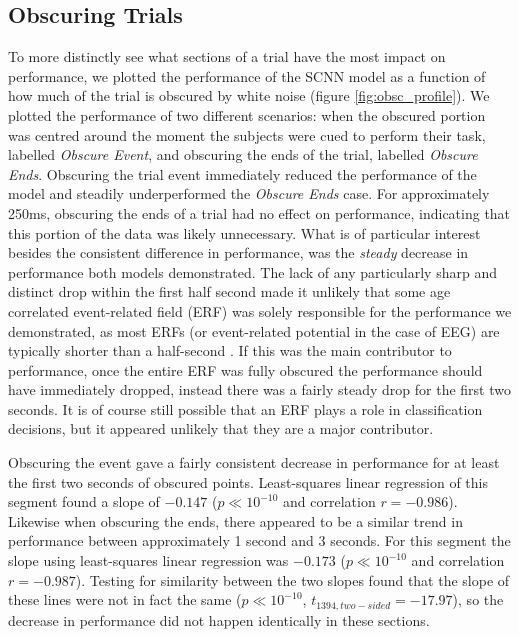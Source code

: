 \documentclass[fleqn,10pt]{wlscirep}
\begin{document}
\subsection*{Obscuring Trials}

To more distinctly see what sections of a trial have the most impact on performance, we plotted the performance of the SCNN model as a function of how much of the trial is obscured by white noise (figure \ref{fig:obsc_profile}). We plotted the performance of two different scenarios: when the obscured portion was centred around the moment the subjects were cued to perform their task, labelled {\em Obscure Event}, and obscuring the ends of the trial, labelled {\em Obscure Ends}. Obscuring the trial event immediately reduced the performance of the model and steadily underperformed the {\em Obscure Ends} case. For approximately 250ms, obscuring the ends of a trial had no effect on performance, indicating that this portion of the data was likely unnecessary. What is of particular interest besides the consistent difference in performance, was the {\em steady} decrease in performance both models demonstrated. The lack of any particularly sharp and distinct drop within the first half second made it unlikely that some age correlated event-related field (ERF) was solely responsible for the performance we demonstrated, as most ERFs (or event-related potential in the case of EEG) are typically shorter than a half-second \cite{ElectricFieldsOfTheBrain}. If this was the main contributor to performance, once the entire ERF was fully obscured the performance should have immediately dropped, instead there was a fairly steady drop for the first two seconds. It is of course still possible that an ERF plays a role in classification decisions, but it appeared unlikely that they are a major contributor.

Obscuring the event gave a fairly consistent decrease in performance for at least the first two seconds of obscured points. Least-squares linear regression of this segment found a slope of $-0.147$ ($p \ll 10^{-10}$ and correlation $r=-0.986$). Likewise when obscuring the ends, there appeared to be a similar trend in performance between approximately 1 second and 3 seconds. For this segment the slope using least-squares linear regression was $-0.173$ ($p \ll 10^{-10}$ and correlation $r=-0.987$). Testing for similarity between the two slopes found that the slope of these lines were not in fact the same ($p \ll 10^{-10}$, $t_{1394, two-sided}=-17.97$), so the decrease in performance did not happen identically in these sections.
\end{document}
